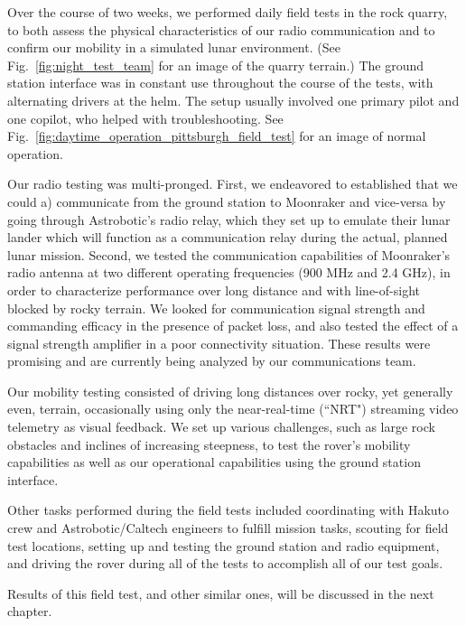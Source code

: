 Over the course of two weeks, we performed daily field tests in the rock quarry, to both assess the physical characteristics of our radio communication and to confirm our mobility in a simulated lunar environment. (See Fig.~\ref{fig:night_test_team} for an image of the quarry terrain.) The ground station interface was in constant use throughout the course of the tests, with alternating drivers at the helm. The setup usually involved one primary pilot and one copilot, who helped with troubleshooting. See Fig.~\ref{fig:daytime_operation_pittsburgh_field_test} for an image of normal operation.

Our radio testing was multi-pronged. First, we endeavored to established that we could a) communicate from the ground station to Moonraker and vice-versa by going through Astrobotic's radio relay, which they set up to emulate their lunar lander which will function as a communication relay during the actual, planned lunar mission. Second, we tested the communication capabilities of Moonraker's radio antenna at two different operating frequencies (900 MHz and 2.4 GHz), in order to characterize performance over long distance and with line-of-sight blocked by rocky terrain. We looked for communication signal strength and commanding efficacy in the presence of packet loss, and also tested the effect of a signal strength amplifier in a poor connectivity situation. These results were promising and are currently being analyzed by our communications team.

Our mobility testing consisted of driving long distances over rocky, yet generally even, terrain, occasionally using only the near-real-time (``NRT") streaming video telemetry as visual feedback. We set up various challenges, such as large rock obstacles and inclines of increasing steepness, to test the rover's mobility capabilities as well as our operational capabilities using the ground station interface.

Other tasks performed during the field tests included coordinating with Hakuto crew and Astrobotic/Caltech engineers to fulfill mission tasks, scouting for field test locations, setting up and testing the ground station and radio equipment, and driving the rover during all of the tests to accomplish all of our test goals.

Results of this field test, and other similar ones, will be discussed in the next chapter.

